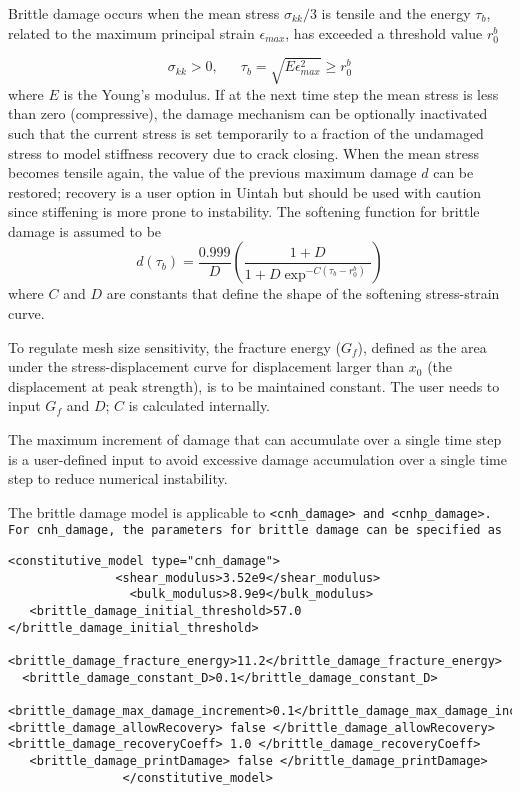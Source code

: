 \begin{enumerate}
Brittle damage occurs when the mean stress $\sigma_{kk}/3$ is tensile
and the energy $\tau_b$, related to the maximum principal 
strain $\epsilon_{max}$, has exceeded a threshold value $r_0^b$

\begin{equation}
\sigma_{kk}>0, \phantom{ijkl}
\tau_b = \sqrt{E \epsilon_{max}^2} \geq r_0^b
\end{equation}
where $E$ is the Young's modulus. If at the next time step the mean stress is less than
zero (compressive), the damage mechanism can be optionally inactivated such that the current stress 
is set temporarily to a fraction of the undamaged stress to 
model stiffness recovery due to crack closing. When the mean stress becomes tensile again,
the value of the previous maximum damage $d$ can be restored; recovery is a user option in Uintah
but should be used with caution since stiffening is more prone to instability.
The softening function for brittle damage is assumed to be
\begin{equation}
d(\tau_b)= \frac{0.999}{D} \left(\frac{1+D}{1+D \exp^{-C(\tau_b-r_0^b)}} \right)
\end{equation}
where $C$ and $D$ are constants that define the shape of the softening
stress-strain curve.
  
To regulate mesh size sensitivity, the fracture energy
($G_f$), defined as the area under the stress-displacement
curve for displacement larger than $x_0$ (the displacement at peak strength), is to be maintained constant.
The user needs to input $G_f$ and $D$; $C$ is calculated internally. 

The maximum increment of damage that can accumulate over a single time
step is a user-defined input to avoid excessive damage accumulation over
a single time step to reduce numerical instability.

The brittle damage model is applicable to \tt <cnh\_damage> \normalfont and 
\tt <cnhp\_damage>. \normalfont For \tt cnh\_damage, \normalfont 
the parameters for brittle damage can be specified as

\begin{Verbatim}[fontsize=\footnotesize]
                <constitutive_model type="cnh_damage">
               <shear_modulus>3.52e9</shear_modulus>
                 <bulk_modulus>8.9e9</bulk_modulus>
   <brittle_damage_initial_threshold>57.0 </brittle_damage_initial_threshold>
  <brittle_damage_fracture_energy>11.2</brittle_damage_fracture_energy>
  <brittle_damage_constant_D>0.1</brittle_damage_constant_D>
 <brittle_damage_max_damage_increment>0.1</brittle_damage_max_damage_increment>
<brittle_damage_allowRecovery> false </brittle_damage_allowRecovery>
<brittle_damage_recoveryCoeff> 1.0 </brittle_damage_recoveryCoeff>
   <brittle_damage_printDamage> false </brittle_damage_printDamage>
                </constitutive_model>


\end{Verbatim}
\end{enumerate}
